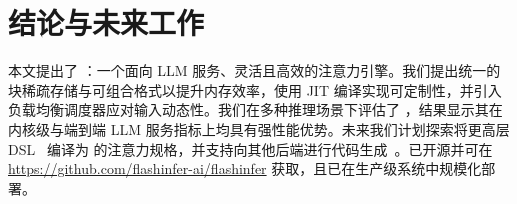\section{结论与未来工作}
\label{sec:conclusion-future-work}

本文提出了 \sys：一个面向 LLM 服务、灵活且高效的注意力引擎。我们提出统一的块稀疏存储与可组合格式以提升内存效率，使用 JIT 编译实现可定制性，并引入负载均衡调度器应对输入动态性。我们在多种推理场景下评估了 \sys，结果显示其在内核级与端到端 LLM 服务指标上均具有强性能优势。未来我们计划探索将更高层 DSL~\cite{wu2024mirage, he2024flexattention} 编译为 \sys 的注意力规格，并支持向其他后端进行代码生成~\cite{ozennvdsl, spector2024thunderkittens, triton}。\sys 已开源并可在 \url{https://github.com/flashinfer-ai/flashinfer} 获取，且已在生产级系统中规模化部署。
